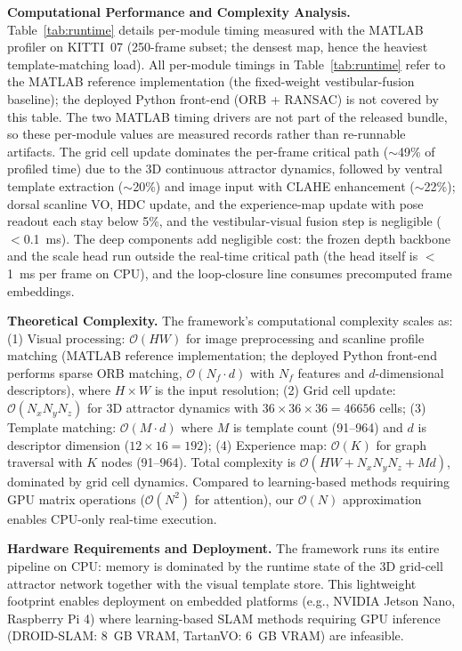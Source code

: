\textbf{Computational Performance and Complexity Analysis.} Table~\ref{tab:runtime} details per-module timing measured with the MATLAB profiler on KITTI~07 (250-frame subset; the densest map, hence the heaviest template-matching load). All per-module timings in Table~\ref{tab:runtime} refer to the MATLAB reference implementation (the fixed-weight vestibular-fusion baseline); the deployed Python front-end (ORB + RANSAC) is not covered by this table. The two MATLAB timing drivers are not part of the released bundle, so these per-module values are measured records rather than re-runnable artifacts. The grid cell update dominates the per-frame critical path ($\sim$49\% of profiled time) due to the 3D continuous attractor dynamics, followed by ventral template extraction ($\sim$20\%) and image input with CLAHE enhancement ($\sim$22\%); dorsal scanline VO, HDC update, and the experience-map update with pose readout each stay below 5\%, and the vestibular-visual fusion step is negligible ($<$0.1~ms). The deep components add negligible cost: the frozen depth backbone and the scale head run outside the real-time critical path (the head itself is $<$1~ms per frame on CPU), and the loop-closure line consumes precomputed frame embeddings.

\textbf{Theoretical Complexity.} The framework's computational complexity scales as: (1) Visual processing: $\mathcal{O}(HW)$ for image preprocessing and scanline profile matching (MATLAB reference implementation; the deployed Python front-end performs sparse ORB matching, $\mathcal{O}(N_f \cdot d)$ with $N_f$ features and $d$-dimensional descriptors), where $H \times W$ is the input resolution; (2) Grid cell update: $\mathcal{O}(N_x N_y N_z)$ for 3D attractor dynamics with $36 \times 36 \times 36 = 46656$ cells; (3) Template matching: $\mathcal{O}(M \cdot d)$ where $M$ is template count (91--964) and $d$ is descriptor dimension ($12 \times 16 = 192$); (4) Experience map: $\mathcal{O}(K)$ for graph traversal with $K$ nodes (91--964). Total complexity is $\mathcal{O}(HW + N_x N_y N_z + Md)$, dominated by grid cell dynamics. Compared to learning-based methods requiring GPU matrix operations ($\mathcal{O}(N^2)$ for attention), our $\mathcal{O}(N)$ approximation enables CPU-only real-time execution.

\textbf{Hardware Requirements and Deployment.} The framework runs its entire pipeline on CPU: memory is dominated by the runtime state of the 3D grid-cell attractor network together with the visual template store. This lightweight footprint enables deployment on embedded platforms (e.g., NVIDIA Jetson Nano, Raspberry Pi 4) where learning-based SLAM methods requiring GPU inference (DROID-SLAM: 8~GB VRAM, TartanVO: 6~GB VRAM) are infeasible.

